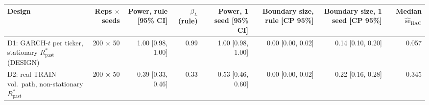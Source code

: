 \begin{tabular}{lrrrrrrr}
\toprule
Design & Reps $\times$ seeds & Power, rule [95\% CI] & $\beta_L$ (rule) & Power, 1 seed [95\% CI] & Boundary size, rule [CP 95\%] & Boundary size, 1 seed [CP 95\%] & Median $\widehat{\mathrm{se}}_{\mathrm{HAC}}$ \\
\midrule
D1: GARCH-$t$ per ticker, stationary $R_{\mathrm{past}}^*$ (DESIGN) & 200 $\times$ 50 & 1.00 [0.98, 1.00] & 0.99 & 1.00 [0.98, 1.00] & 0.00 [0.00, 0.02] & 0.14 [0.10, 0.20] & 0.057 \\
D2: real TRAIN vol.\ path, non-stationary $R_{\mathrm{past}}^*$ & 200 $\times$ 50 & 0.39 [0.33, 0.46] & 0.33 & 0.53 [0.46, 0.60] & 0.00 [0.00, 0.02] & 0.22 [0.16, 0.28] & 0.345 \\
\bottomrule
\end{tabular}
